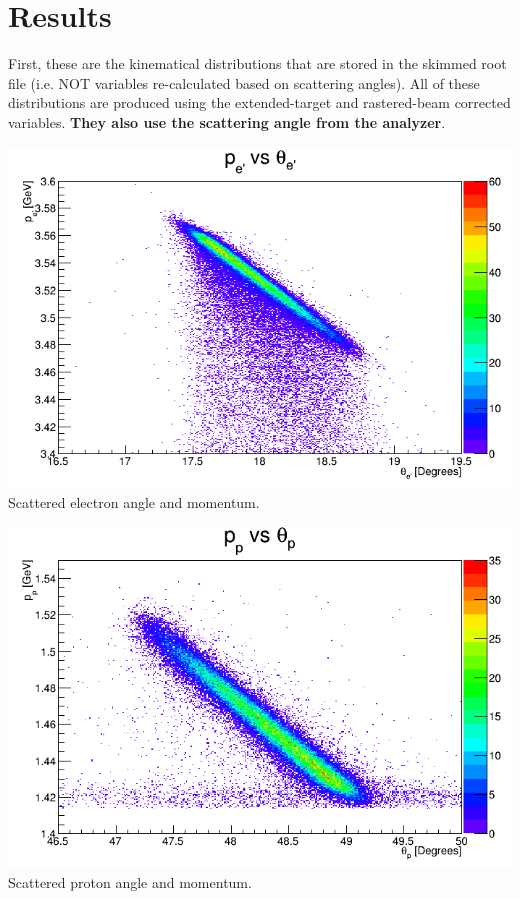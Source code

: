 \documentclass{article}
\begin{document}
\section*{Results}
First, these are the kinematical distributions that are stored in the skimmed root file (i.e. NOT variables re-calculated based on scattering angles). All of these distributions are produced using the extended-target and rastered-beam corrected variables. \textbf{They also use the scattering angle from the analyzer}.
\begin{center}
\includegraphics[width=15cm]{Pe_Te.png}\\
Scattered electron angle and momentum.
\end{center}

\begin{center}
\includegraphics[width=15cm]{Pp_Tp.png}\\
Scattered proton angle and momentum.
\end{center}
\end{document}
